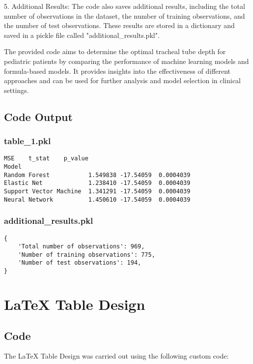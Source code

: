 \documentclass[11pt]{article}
\begin{document}
5. Additional Results: The code also saves additional results, including the total number of observations in the dataset, the number of training observations, and the number of test observations. These results are stored in a dictionary and saved in a pickle file called "additional\_results.pkl". 

The provided code aims to determine the optimal tracheal tube depth for pediatric patients by comparing the performance of machine learning models and formula-based models. It provides insights into the effectiveness of different approaches and can be used for further analysis and model selection in clinical settings.

\subsection{Code Output}

\subsubsection*{table\_1.pkl}

\begin{Verbatim}[tabsize=4]
                             MSE    t_stat    p_value
Model
Random Forest           1.549838 -17.54059  0.0004039
Elastic Net             1.238410 -17.54059  0.0004039
Support Vector Machine  1.341291 -17.54059  0.0004039
Neural Network          1.450610 -17.54059  0.0004039
\end{Verbatim}

\subsubsection*{additional\_results.pkl}

\begin{Verbatim}[tabsize=4]
{
    'Total number of observations': 969,
    'Number of training observations': 775,
    'Number of test observations': 194,
}
\end{Verbatim}

\section{LaTeX Table Design}
\subsection{{Code}}
The LaTeX Table Design was carried out using the following custom code:
\end{document}

